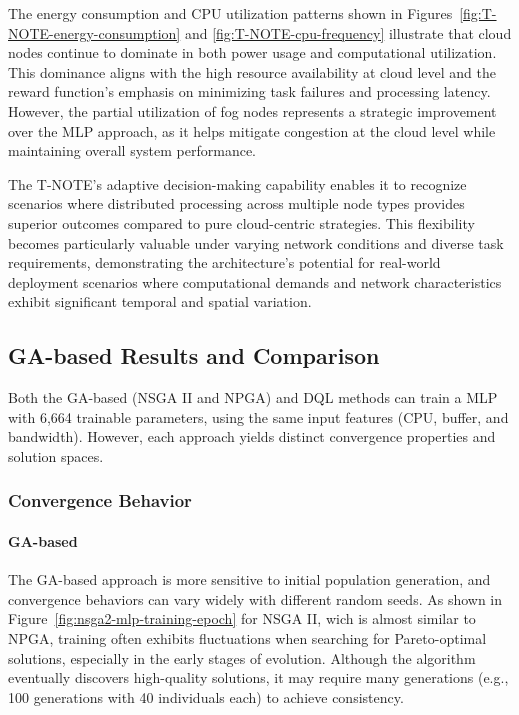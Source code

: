 \documentclass[preprint,3p,authoryear]{elsarticle}
\begin{document}
The energy consumption and CPU utilization patterns shown in Figures~\ref{fig:T-NOTE-energy-consumption} and \ref{fig:T-NOTE-cpu-frequency} illustrate that cloud nodes continue to dominate in both power usage and computational utilization. This dominance aligns with the high resource availability at cloud level and the reward function's emphasis on minimizing task failures and processing latency. However, the partial utilization of fog nodes represents a strategic improvement over the MLP approach, as it helps mitigate congestion at the cloud level while maintaining overall system performance.

The T-NOTE's adaptive decision-making capability enables it to recognize scenarios where distributed processing across multiple node types provides superior outcomes compared to pure cloud-centric strategies. This flexibility becomes particularly valuable under varying network conditions and diverse task requirements, demonstrating the architecture's potential for real-world deployment scenarios where computational demands and network characteristics exhibit significant temporal and spatial variation.




\subsection{GA-based Results and Comparison}\label{subsec:ga_vs_DQL}

Both the GA-based (NSGA II and NPGA) and DQL methods can train a MLP with 6,664 trainable parameters, using the same input features (CPU, buffer, and bandwidth). However, each approach yields distinct convergence properties and solution spaces.

\subsubsection{Convergence Behavior}
\paragraph{GA-based}
The GA-based approach is more sensitive to initial population generation, and convergence behaviors can vary widely with different random seeds. As shown in Figure~\ref{fig:nsga2-mlp-training-epoch} for NSGA II, wich is almost similar to NPGA, training often exhibits fluctuations when searching for Pareto-optimal solutions, especially in the early stages of evolution. Although the algorithm eventually discovers high-quality solutions, it may require many generations (e.g., 100 generations with 40 individuals each) to achieve consistency.
\end{document}
